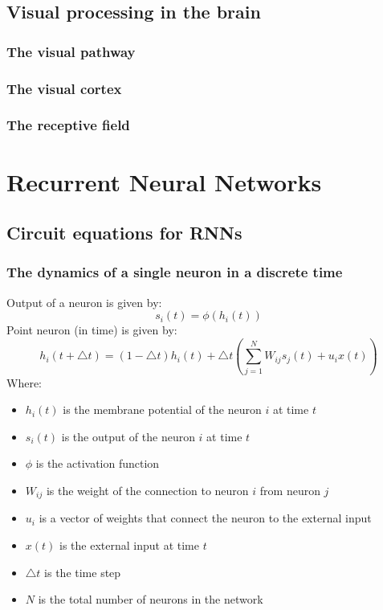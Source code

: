 \documentclass[11pt]{book} %
\begin{document}
\section{Visual processing in the brain}
\subsection{The visual pathway}
\subsection{The visual cortex}
\subsection{The receptive field}


%
%
%
%
%
%
%
%
%
%
%
%
%
%
%
%


\chapter{Recurrent Neural Networks}

\section{Circuit equations for RNNs}


\subsection{The dynamics of a single neuron in a discrete time}
Output of a neuron is given by:
\[
    s_i(t) = \phi(h_i(t))
\]
Point neuron (in time) is given by:
\[
    h_i(t + \bigtriangleup  t) = (1 - \bigtriangleup t) h_i(t) + \bigtriangleup t (\sum_{j=1}^N W_{ij} s_j(t) + u_ix(t))
\]
Where:
\begin{itemize}
    \item $h_i(t)$ is the membrane potential of the neuron $i$ at time $t$
    \item $s_i(t)$ is the output of the neuron $i$ at time $t$
    \item $\phi$ is the activation function
    \item $W_{ij}$ is the weight of the connection to neuron $i$ from neuron $j$
    \item $u_i$ is a vector of weights that connect the neuron to the external input
    \item $x(t)$ is the external input at time $t$
    \item $\bigtriangleup t$ is the time step
    \item $N$ is the total number of neurons in the network
\end{itemize}
\end{document}
